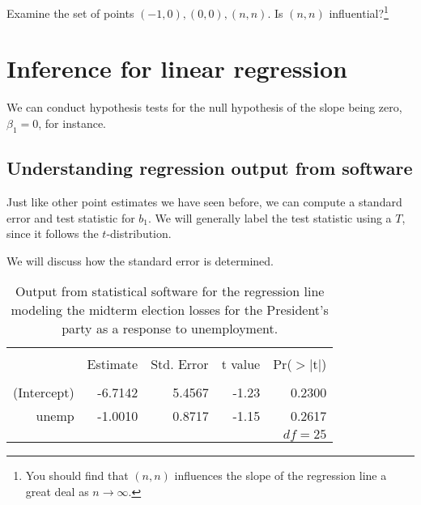 \begin{exercise}
Examine the set of points $(-1,0),(0,0),(n,n)$. Is $(n,n)$ influential?\footnote{You should find that $(n,n)$ influences the slope of the regression line a great deal as $n\to\infty$.}
\end{exercise}


\section{Inference for linear regression}
\label{inferenceForLinearRegression}

We can conduct hypothesis tests for the null hypothesis of the slope being zero, $\beta_1=0$, for instance.


\subsection{Understanding regression output from software}
\label{testStatisticForTheSlope}

Just like other point estimates we have seen before, we can compute a standard error and test statistic for $b_1$. We will generally label the test statistic using a $T$, since it follows the $t$-distribution.

We will discuss how the standard error is determined. 

\begin{table}%
\centering
\begin{tabular}{rrrrr}
  \hline
  \vspace{-3.7mm} & & & & \\
 & Estimate & Std. Error & t value & Pr($>$$|$t$|$) \\ 
  \hline
  \vspace{-3.6mm} & & & & \\
(Intercept) & -6.7142 & 5.4567 & -1.23 & 0.2300 \\ 
  unemp & -1.0010 & 0.8717 & -1.15 & 0.2617 \\ 
   \hline
   \multicolumn{5}{r}{$df=25$} \\
\end{tabular}
\caption{Output from statistical software for the regression line modeling the midterm election losses for the President's party as a response to unemployment.}
\label{midtermElectionUnemploymentRRegressionOutput}
\end{table}

